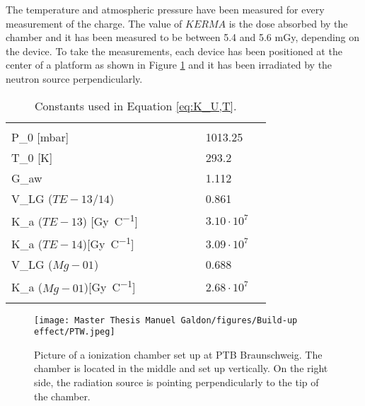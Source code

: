 The temperature and atmospheric pressure have been measured for every measurement of the charge.
The value of ${KERMA}$ is the dose absorbed by the chamber and it has been measured to be between 5.4 and 5.6 \unit{\milli\gray}, depending on the device.
To take the measurements, each device has been positioned at the center of a platform as shown in Figure \ref{fig:Actual IC at PTW} and it has been irradiated by the neutron source perpendicularly.
\clearpage
\begin{table}[!h]
\centering
\begin{tabular}{llllllll}
                                              &  &  &  &  &  &                            &  \\
\cellcolor[HTML]{D9D9D9}P_0 {[}\unit{\milli\bar}{]}         &  &  &  &  &  & 1013.25                    &  \\
\cellcolor[HTML]{D9D9D9}T_0 {[}\unit{\kelvin}{}{]}            &  &  &  &  &  & 293.2                      &  \\
\cellcolor[HTML]{D9D9D9}G_{aw}                   &  &  &  &  &  & 1.112                      &  \\
\cellcolor[HTML]{D9D9D9}V_{LG} ($TE-13/14$)              &  &  &  &  &  & 0.861                      &  \\
\cellcolor[HTML]{D9D9D9}K_a  ($TE-13$) {[}\unit{\gray\per\coulomb}{]}  &  &  &  &  &  & $3.10 \cdot 10^{7}$ &  \\
\cellcolor[HTML]{D9D9D9}K_a  ($TE-14$){[}\unit{\gray\per\coulomb}{]}  &  &  &  &  &  & $3.09 \cdot 10^{7}$ &  \\
\cellcolor[HTML]{D9D9D9}V_{LG} ($Mg-01$)           &  &  &  &  &  & 0.688                      &  \\
\cellcolor[HTML]{D9D9D9}K_a ($Mg-01$){[}\unit{\gray\per\coulomb}{]}  &  &  &  &  &  & $2.68 \cdot 10^{7}$ &  \\
                                              &  &  &  &  &  &                            & 
\end{tabular}
\caption{Constants used in Equation \ref{eq:K_U,T}.}
\label{tab:constants for PTB}
\end{table}



\begin{figure}[!h]
\centering
\begin{minipage}{0.7\textwidth}
    \centering
    \texttt{[image: Master Thesis Manuel Galdon/figures/Build-up effect/PTW.jpeg]} 
    \caption{Picture of a ionization chamber set up at PTB Braunschweig. The chamber is located in the middle and set up vertically. On the right side, the radiation source is pointing perpendicularly to the tip of the chamber.}
    \label{fig:Actual IC at PTW}
\end{minipage}
\end{figure}

